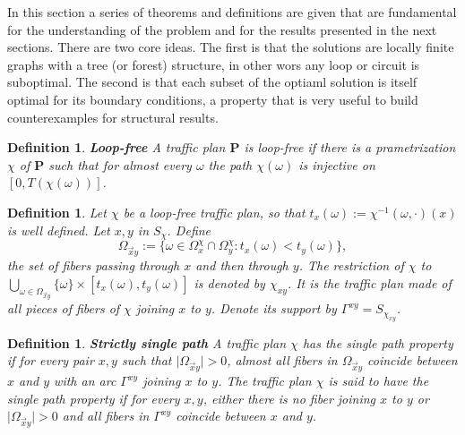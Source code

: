 \documentclass[12pt,a4paper]{article}
\numberwithin{equation}{section}
\theoremstyle{mytheorem}
\newtheorem{definition}[subsubsection]{Definition}
\theoremstyle{myremark}
\theoremstyle{myparagraph}
\begin{document}
    In this section a series of theorems and definitions are given that are fundamental for the understanding of the
    problem and for the results presented in the next sections.
    There are two core ideas. The first is that the solutions are locally finite graphs with a tree (or forest) structure, in other wors any loop or circuit
    is suboptimal. The second is that each subset of the optiaml solution is itself optimal for its boundary conditions, a property
    that is very useful to build counterexamples for structural results. 

    \begin{definition}
        \textbf{Loop-free}
        A traffic plan $\mathbf{P}$ is loop-free if there is a prametrization $\chi$ of $\mathbf{P}$ such that for almost every $\omega$
        the path $\chi(\omega)$ is injective on $[0, T(\chi(\omega))]$.
    \end{definition}

    \begin{definition}
        Let $\chi$ be a loop-free traffic plan, so that $t_x(\omega) := \chi^{-1}(\omega, \cdot)(x)$ is well defined.
        Let $x, y$ in $S_\chi$. Define
        \[
            \Omega_{\overset{\rightarrow}{x}y} := \{\omega \in \Omega_x^\chi \cap \Omega_y^\chi : t_x(\omega) < t_y(\omega)\},
        \]
        the set of fibers passing through $x$ and then through $y$.
        The restriction of $\chi$ to $\bigcup_{\omega \in \Omega_{\overset{\rightarrow}{x}y}} \{\omega\} \times [t_x(\omega), t_y(\omega)]$ is denoted by $\chi_{xy}$.
        It is the traffic plan made of all pieces of fibers of $\chi$ joining $x$ to $y$. Denote its support by $\Gamma^{xy} = S_{\chi_{xy}}$.

    \end{definition}

    \begin{definition}
        \textbf{Strictly single path}
        A \textit{traffic plan} $\chi$ has the \textit{single path property} if for every pair $x, y$ such that
        $\lvert \Omega_{\overset{\rightarrow}{x}y} \rvert > 0$, almost all fibers in $\Omega_{\overset{\rightarrow}{x}y}$
        coincide between $x$ and $y$ with an arc $\Gamma^{xy}$ joining $x$ to $y$. 
        The traffic plan $\chi$ is said to have the \textit{single path property} 
        if for every $x, y$, either there is no fiber joining $x$ to $y$
        or $\lvert \Omega_{\overset{\rightarrow}{x}y} \rvert > 0$ and all fibers in $\Gamma^{xy}$ coincide between $x$ and $y$.
    \end{definition}
\end{document}
